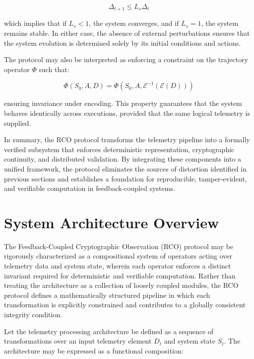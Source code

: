 \begin{equation}
\Delta_{t+1} \leq L_s \Delta_t
\end{equation}

which implies that if $L_s < 1$, the system converges, and if $L_s = 1$, the system remains stable. In either case, the absence of external perturbations ensures that the system evolution is determined solely by its initial conditions and actions.

The protocol may also be interpreted as enforcing a constraint on the trajectory operator $\Phi$ such that:

\begin{equation}
\Phi(S_0, A, D) = \Phi(S_0, A, \mathcal{E}^{-1}(\mathcal{E}(D)))
\end{equation}

ensuring invariance under encoding. This property guarantees that the system behaves identically across executions, provided that the same logical telemetry is supplied.

In summary, the RCO protocol transforms the telemetry pipeline into a formally verified subsystem that enforces deterministic representation, cryptographic continuity, and distributed validation. By integrating these components into a unified framework, the protocol eliminates the sources of distortion identified in previous sections and establishes a foundation for reproducible, tamper-evident, and verifiable computation in feedback-coupled systems.

\section{System Architecture Overview}

The Feedback-Coupled Cryptographic Observation (RCO) protocol may be rigorously characterized as a compositional system of operators acting over telemetry data and system state, wherein each operator enforces a distinct invariant required for deterministic and verifiable computation. Rather than treating the architecture as a collection of loosely coupled modules, the RCO protocol defines a mathematically structured pipeline in which each transformation is explicitly constrained and contributes to a globally consistent integrity condition.

Let the telemetry processing architecture be defined as a sequence of transformations over an input telemetry element $D_t$ and system state $S_t$. The architecture may be expressed as a functional composition:

